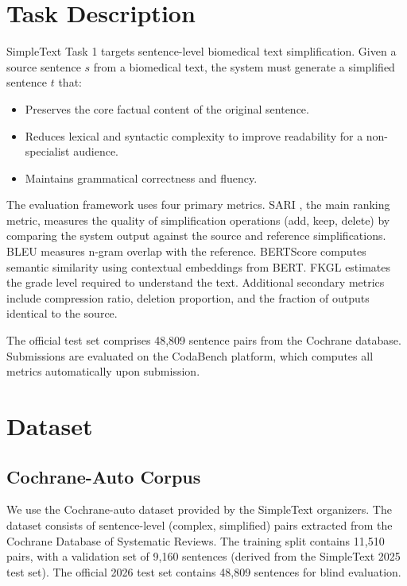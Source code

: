 \documentclass{ceurart}
\begin{document}
\section{Task Description}

SimpleText Task 1 \cite{bakker2026task1} targets sentence-level biomedical text simplification.
Given a source sentence \(s\) from a biomedical text, the system must generate a simplified sentence \(t\) that:

\begin{itemize}
    \item Preserves the core factual content of the original sentence.
    \item Reduces lexical and syntactic complexity to improve readability for a non-specialist audience.
    \item Maintains grammatical correctness and fluency.
\end{itemize}

The evaluation framework uses four primary metrics.
SARI \cite{sari2016}, the main ranking metric, measures the quality of simplification operations (add, keep, delete) by comparing the system output against the source and reference simplifications.
BLEU \cite{bleu2002} measures n-gram overlap with the reference.
BERTScore \cite{bertscore2020} computes semantic similarity using contextual embeddings from BERT.
FKGL \cite{kincaid1975} estimates the grade level required to understand the text.
Additional secondary metrics include compression ratio, deletion proportion, and the fraction of outputs identical to the source.

The official test set comprises 48,809 sentence pairs from the Cochrane database.
Submissions are evaluated on the CodaBench platform, which computes all metrics automatically upon submission.

\section{Dataset}

\subsection{Cochrane-Auto Corpus}

We use the Cochrane-auto dataset provided by the SimpleText organizers.
The dataset consists of sentence-level (complex, simplified) pairs extracted from the Cochrane Database of Systematic Reviews.
The training split contains 11,510 pairs, with a validation set of 9,160 sentences (derived from the SimpleText 2025 test set).
The official 2026 test set contains 48,809 sentences for blind evaluation.
\end{document}
